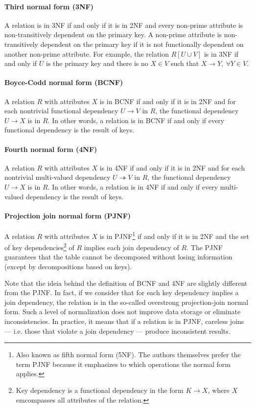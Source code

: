 \paragraph{Third normal form (3NF)}  A relation is in 3NF if and only if it is in 2NF
and every non-prime attribute is non-transitively dependent on the primary key.  A
non-prime attribute is non-transitively dependent on the primary key if it is not
functionally dependent on another non-prime attribute.  For example, the relation $R[U
\cup V]$ is in 3NF if and only if $U$ is the primary key and there is no $X \in V$ such
that $X \to Y,~\forall Y \in V$.

\paragraph{Boyce-Codd normal form (BCNF)}  A relation $R$ with attributes $X$ is in BCNF
if and only if it is in 2NF and for each nontrivial functional dependency $U \to V$ in
$R$, the functional dependency $U \to X$ is in $R$.  In other words, a relation is in BCNF
if and only if every functional dependency is the result of keys.

\paragraph{Fourth normal form (4NF)}  A relation $R$ with attributes $X$ is in 4NF if
and only if it is in 2NF and for each nontrivial multi-valued dependency $U \twoheadrightarrow
V$ in $R$, the functional dependency $U \to X$ is in $R$.  In other words, a relation is
in 4NF if and only if every multi-valued dependency is the result of keys.

\paragraph{Projection join normal form (PJNF)} A relation $R$ with attributes $X$ is in
PJNF\footnote{Also known as fifth normal form (5NF).  The authors themselves prefer
the term PJNF because it emphasizes to which operations the normal form applies.}
if and only if it is in 2NF and
the set of key dependencies\footnote{Key dependency is a functional dependency in the form
$K \to X$, where $X$ emcompasses all attributes of the relation.} of $R$ implies each join
dependency of $R$.  The PJNF guarantees that the
table cannot be decomposed without losing information (except by decompositions based on
keys).

Note that the ideia behind the definition of BCNF and 4NF are slightly different from the
PJNF.  In fact, if we consider that for each key dependency implies a join dependency, the
relation is in the so-called overstrong projection-join normal
form.  Such a level of normalization does not improve data storage
or eliminate inconsistencies.  In practice, it means that if a relation is in PJNF,
careless joins --- i.e. those that violate a join dependency --- produce
inconsistent results.


